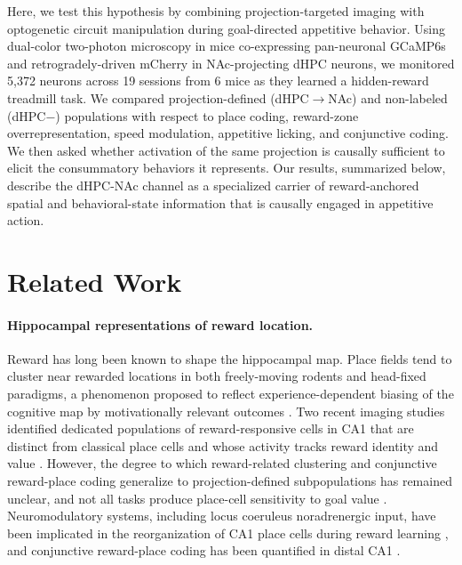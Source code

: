 Here, we test this hypothesis by combining projection-targeted imaging with optogenetic circuit manipulation during goal-directed appetitive behavior. Using dual-color two-photon microscopy in mice co-expressing pan-neuronal GCaMP6s and retrogradely-driven mCherry in NAc-projecting dHPC neurons, we monitored 5,372 neurons across 19 sessions from 6 mice as they learned a hidden-reward treadmill task. We compared projection-defined (dHPC$\rightarrow$NAc) and non-labeled (dHPC$-$) populations with respect to place coding, reward-zone overrepresentation, speed modulation, appetitive licking, and conjunctive coding. We then asked whether activation of the same projection is causally sufficient to elicit the consummatory behaviors it represents. Our results, summarized below, describe the dHPC-NAc channel as a specialized carrier of reward-anchored spatial and behavioral-state information that is causally engaged in appetitive action.

\section{Related Work}

\paragraph{Hippocampal representations of reward location.}
Reward has long been known to shape the hippocampal map. Place fields tend to cluster near rewarded locations in both freely-moving rodents and head-fixed paradigms, a phenomenon proposed to reflect experience-dependent biasing of the cognitive map by motivationally relevant outcomes \citep{Hok2007Goal,Mamad2017PlaceField,Sato2020Overrepresentation}. Two recent imaging studies identified dedicated populations of reward-responsive cells in CA1 that are distinct from classical place cells and whose activity tracks reward identity and value \citep{Gauthier2018Reward,Sosa2018Reward}. However, the degree to which reward-related clustering and conjunctive reward-place coding generalize to projection-defined subpopulations has remained unclear, and not all tasks produce place-cell sensitivity to goal value \citep{Duvelle2019PlaceCells}. Neuromodulatory systems, including locus coeruleus noradrenergic input, have been implicated in the reorganization of CA1 place cells during reward learning \citep{Kaufman2020LocusCoeruleus}, and conjunctive reward-place coding has been quantified in distal CA1 \citep{Xiao2020Conjunctive}.

